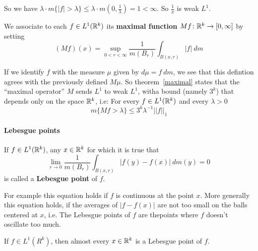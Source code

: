 So we have $\lambda\cdot m\{|f|>\lambda\} \leq \lambda\cdot m(0,\frac{1}{\lambda}) = 1<\infty$. So $\frac{1}{x}$ is weak $L^1$.
\begin{definition}
    We associate to each $f\in L^1(\mathbb{R}^k)$ its \textbf{maximal function} $Mf\colon \mathbb{R}^k\rightarrow [0,\infty]$ by setting\begin{equation*}
        (Mf)(x) = \sup_{0<r<\infty}\frac{1}{m(B_r)}\int_{B(x,r)}|f|~dm
    \end{equation*}
\end{definition}
If we identify $f$ with the measure $\mu$ given by $d\mu = f~dm$, we see that this defintion agrees with the previously defined $M\mu$. So theorem~\ref{maximal} states that the ``maximal operator'' $M$ sends $L^1$ to weak $L^1$, witha bound (namely $3^k$)
that depends only on the space $\mathbb{R}^k$, i.e: For every $f\in L^1(\mathbb{R}^k)$ and every $\lambda>0$\begin{equation*}
    m\{Mf>\lambda\} \leq 3^k\lambda^{-1}||f||_1
\end{equation*}

\paragraph*{Lebesgue points} 
\begin{definition}
    If $f\in L^1(\mathbb{R}^k)$, any $x\in \mathbb{R}^k$ for which it is true that\[\lim_{r\rightarrow 0}\frac{1}{m(B_r)}\int_{B(x,r)} |f(y)-f(x)|~dm(y) = 0\]
    is called a \textbf{Lebesgue point} of $f$.
\end{definition}
For example this equation holds if $f$ is continuous at the point $x$. More generally this equation holds, if the averages of $|f-f(x)|$ are not too small on the balls centered at $x$, i.e. The Lebesgue points of $f$ are thepoints where $f$ doesn't oscillate too much.

\begin{theorem}
    If $f\in L^1(R^k)$, then almost every $x\in \mathbb{R}^k$ is a Lebesgue point of $f$.
\end{theorem}

\printindex
